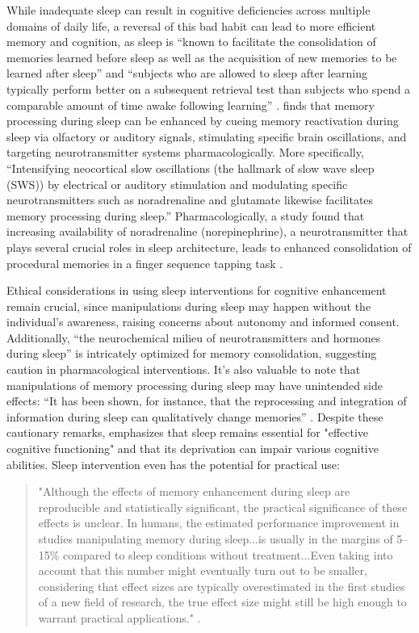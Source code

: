 \documentclass[stu, 12pt]{apa7}
\begin{document}
While inadequate sleep can result in cognitive deficiencies across multiple domains of daily life, a reversal of this bad habit can lead to more efficient memory and cognition, as sleep is ``known to facilitate the consolidation of memories learned before sleep as well as the acquisition of new memories to be learned after sleep'' and ``subjects who are allowed to sleep after learning typically perform better on a subsequent retrieval test than subjects who spend a comparable amount of time awake following learning'' \parencite{6}. \citeauthor{6} finds that memory processing during sleep can be enhanced by cueing memory reactivation during sleep via olfactory or auditory signals, stimulating specific brain oscillations, and targeting neurotransmitter systems pharmacologically. More specifically, ``Intensifying neocortical slow oscillations (the hallmark of slow wave sleep (SWS)) by electrical or auditory stimulation and modulating specific neurotransmitters such as noradrenaline and glutamate likewise facilitates memory processing during sleep.'' Pharmacologically, a study found that increasing availability of noradrenaline (norepinephrine), a neurotransmitter that plays several crucial roles in sleep architecture, leads to enhanced consolidation of procedural memories in a finger sequence tapping task \parencite{16}. 

Ethical considerations in using sleep interventions for cognitive enhancement remain crucial, since manipulations during sleep may happen without the individual's awareness, raising concerns about autonomy and informed consent. Additionally, ``the neurochemical milieu of neurotransmitters and hormones during sleep'' \parencite{6} is intricately optimized for memory consolidation, suggesting caution in pharmacological interventions. It's also valuable to note that manipulations of memory processing during sleep may have unintended side effects: ``It has been shown, for instance, that the reprocessing and integration of information during sleep can qualitatively change memories'' \parencite{6}. Despite these cautionary remarks, \citeauthor{6} emphasizes that sleep remains essential for "effective cognitive functioning" and that its deprivation can impair various cognitive abilities. Sleep intervention even has the potential for practical use: 
\begin{quote}

	"Although the effects of memory enhancement during sleep are reproducible and statistically significant, the practical significance of these effects is unclear. In humans, the estimated performance improvement in studies manipulating memory during sleep...is usually in the margins of 5–15\% compared to sleep conditions without treatment...Even taking into account that this number might eventually turn out to be smaller, considering that effect sizes are typically overestimated in the first studies of a new field of research, the true effect size might still be high enough to warrant practical applications." \parencite{6}. 

\end{quote}
\end{document}
